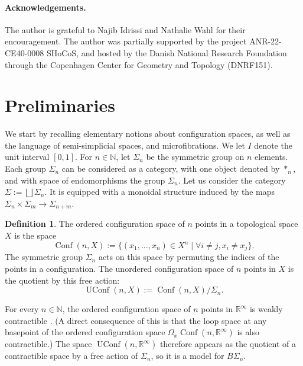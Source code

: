 \documentclass[12pt]{amsart}
\theoremstyle{plain}
\theoremstyle{definition}
\newtheorem{defi}[teo]{Definition}
\theoremstyle{remark}
\DeclareMathOperator{\Conf}{Conf}
\DeclareMathOperator{\UConf}{UConf}
\begin{document}
\paragraph{\textbf{Acknowledgements.}}
The author is grateful to Najib Idrissi and Nathalie Wahl for their encouragement. 
The author was partially supported by the project ANR-22-CE40-0008 SHoCoS, and hosted by the Danish National Research Foundation through the Copenhagen Center for Geometry and Topology (DNRF151).

\section{Preliminaries}

We start by recalling elementary notions about configuration spaces, as well as the language of semi-simplicial spaces, and microfibrations.
We let $I$ denote the unit interval $[0,1]$.
For $n\in\mathbb{N}$, let $\Sigma_n$ be the symmetric group on $n$ elements. Each group $\Sigma_n$ can be considered as a category, with one object denoted by $*_n$, and with space of endomorphisms the group $\Sigma_n$. Let us consider the category $\Sigma := \displaystyle \bigsqcup \Sigma_n$. 
It is equipped with a monoidal structure induced by the maps $\Sigma_n\times \Sigma_m\rightarrow \Sigma_{n+m}$.

\begin{defi}
The ordered configuration space of $n$ points in a topological space $X$ is the space
\[\Conf  (n,X):= \{(x_1,\dots, x_n)\in X^n \mid \forall i\neq j, x_i\neq x_j\}.\]
The symmetric group $\Sigma_n$ acts on this space by permuting the indices of the points in a configuration.
The unordered configuration space of $n$ points in $X$ is the quotient by this free action:
\[\UConf  (n,X):= \Conf  (n,X)/\Sigma_n.\]
\end{defi}

For every $n\in\mathbb{N}$, the ordered configuration space of $n$ points in $\mathbb{R}^\infty$ is weakly contractible \cite[Theorem~4.4]{itloopspacesmay}.
(A direct consequence of this is that the loop space at any basepoint of the ordered configuration space $\Omega_x \Conf (n, \mathbb{R}^\infty)$ is also contractible.)
The space $ \UConf (n, \mathbb{R}^\infty)$ therefore appears as the quotient of a contractible space by a free action of $ \displaystyle \Sigma_n$, so it is a model for $B\displaystyle \Sigma_n$.
 
\end{document}
